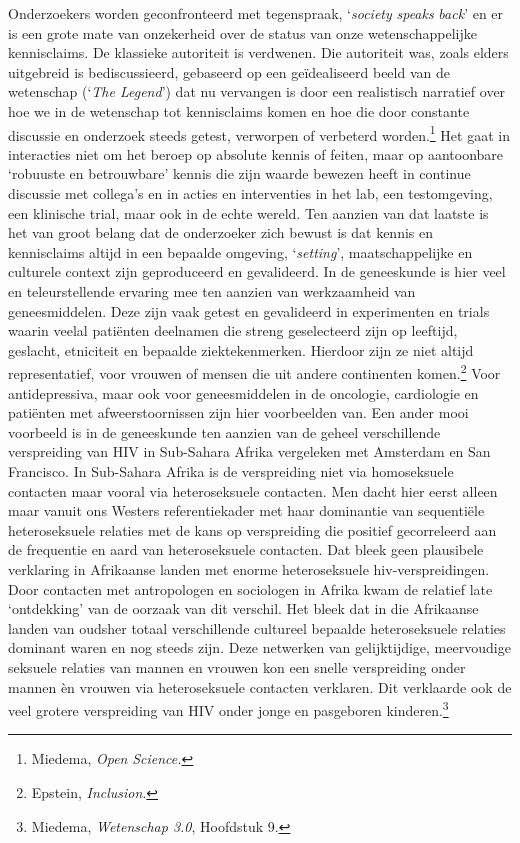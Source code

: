 \documentclass[smallauthor, chapterhaspagenum, nochapterinheader, pagenuminheader,  bigchapnum,medium2, tocpages, garamond, titleinheader]{jote-book}
\begin{document}
	Onderzoekers worden geconfronteerd met tegenspraak, ‘\emph{society }\emph{speaks}\emph{ back}' en er is een grote mate van onzekerheid over de status van onze wetenschappelijke kennisclaims. De klassieke autoriteit is verdwenen. Die autoriteit was, zoals elders uitgebreid is bediscussieerd, gebaseerd op een geïdealiseerd beeld van de wetenschap (‘\emph{The Legend}') dat nu vervangen is door een realistisch narratief over hoe we in de wetenschap tot kennisclaims komen en hoe die door constante discussie en onderzoek steeds getest, verworpen of verbeterd worden.\footnote{Miedema, \emph{Open }\emph{Science}\emph{.}} Het gaat in interacties niet om het beroep op absolute kennis of feiten, maar op aantoonbare ‘robuuste en betrouwbare' kennis die zijn waarde bewezen heeft in continue discussie met collega's en in acties en interventies in het lab, een testomgeving, een klinische trial, maar ook in de echte wereld. Ten aanzien van dat laatste is het van groot belang dat de onderzoeker zich bewust is dat kennis en kennisclaims altijd in een bepaalde omgeving, ‘\emph{setting}', maatschappelijke en culturele context zijn geproduceerd en gevalideerd. In de geneeskunde is hier veel en teleurstellende ervaring mee ten aanzien van werkzaamheid van geneesmiddelen. Deze zijn vaak getest en gevalideerd in experimenten en trials waarin veelal patiënten deelnamen die streng geselecteerd zijn op leeftijd, geslacht, etniciteit en bepaalde ziektekenmerken. Hierdoor zijn ze niet altijd representatief, voor vrouwen of mensen die uit andere continenten komen.\footnote{Epstein, \emph{Inclusion}.} Voor antidepressiva, maar ook voor geneesmiddelen in de oncologie, cardiologie en patiënten met afweerstoornissen zijn hier voorbeelden van. Een ander mooi voorbeeld is in de geneeskunde ten aanzien van de geheel verschillende verspreiding van HIV in Sub-Sahara Afrika vergeleken met Amsterdam en San Francisco. In Sub-Sahara Afrika is de verspreiding niet via homoseksuele contacten maar vooral via heteroseksuele contacten. Men dacht hier eerst alleen maar vanuit ons Westers referentiekader met haar dominantie van sequentiële heteroseksuele relaties met de kans op verspreiding die positief gecorreleerd aan de frequentie en aard van heteroseksuele contacten. Dat bleek geen plausibele verklaring in Afrikaanse landen met enorme heteroseksuele hiv-verspreidingen. Door contacten met antropologen en sociologen in Afrika kwam de relatief late ‘ontdekking' van de oorzaak van dit verschil. Het bleek dat in die Afrikaanse landen van oudsher totaal verschillende cultureel bepaalde heteroseksuele relaties dominant waren en nog steeds zijn. Deze netwerken van gelijktijdige, meervoudige seksuele relaties van mannen en vrouwen kon een snelle verspreiding onder mannen èn vrouwen via heteroseksuele contacten verklaren. Dit verklaarde ook de veel grotere verspreiding van HIV onder jonge en pasgeboren kinderen.\footnote{Miedema, \emph{Wetenschap 3.0}, Hoofdstuk 9. }
\end{document}
